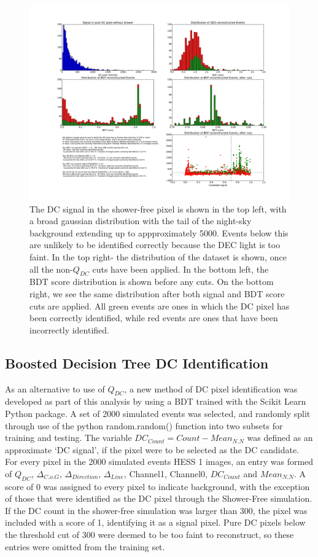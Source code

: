 \documentclass{article}
\begin{document}
\begin{figure}
\begin{center}
\includegraphics[width=\textwidth]{cutdistributionhess1}
\caption{The DC signal in the shower-free pixel is shown in the top left, with a broad gaussian distribution with the tail of the night-sky background extending up to appproximately 5000. Events below this are unlikely to be identified correctly because the DEC light is too faint. In the top right- the distribution of the dataset is shown, once all the non-$Q_{DC}$ cuts have been applied. In the bottom left, the BDT score distribution is shown before any cuts. On the bottom right, we see the same distribution after both signal and BDT score cuts are applied. All green events are ones in which the DC pixel has been correctly identified, while red events are ones that have been incorrectly identified.}
\label{fig:cutdistribution}
\end{center}
\end{figure} 

\subsection{Boosted Decision Tree DC Identification}  As an alternative to use of $Q_{DC}$, a new method of DC pixel identification was developed as part of this analysis by using a BDT trained with the Scikit Learn Python package. A set of 2000 simulated events was selected, and randomly split through use of the python random.random() function into two subsets for training and testing. The variable $DC_{Count} = Count-Mean_{N.N}$ was defined as an approximate \textquoteleft DC signal', if the pixel were to be selected as the DC candidate. For every pixel in the 2000 simulated events HESS 1 images, an entry was formed of $Q_{DC}$, $ \Delta_{C.o.G}$, $\Delta_{Direction}$, $\Delta_{Line}$, Channel1, Channel0, $DC_{Count}$ and $Mean_{N.N}$. A score of 0 was assigned to every pixel to indicate background, with the exception of those that were identified as the DC pixel through the Shower-Free simulation. If the DC count in the shower-free simulation was larger than 300, the pixel was included with a score of 1, identifying it as a signal pixel. Pure DC pixels below the threshold cut of 300 were deemed to be too faint to reconstruct, so these entries were omitted from the training set.
\end{document}

